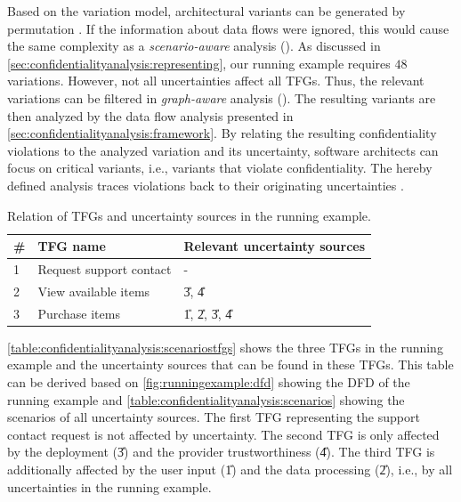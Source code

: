 Based on the variation model, architectural variants can be generated by permutation \cite{mehl_palladio_2022}.
If the information about data flows were ignored, this would cause the same complexity as a \emph{scenario-aware} analysis ().
As discussed in \autoref{sec:confidentialityanalysis:representing}, our running example requires $48$ variations.
However, not all uncertainties affect all \acp{TFG}.
Thus, the relevant variations can be filtered in \emph{graph-aware} analysis ().
The resulting variants are then analyzed by the data flow analysis presented in \autoref{sec:confidentialityanalysis:framework}.
By relating the resulting confidentiality violations to the analyzed variation and its uncertainty, software architects can focus on critical variants, i.e., variants that violate confidentiality.
The hereby defined analysis traces violations back to their originating uncertainties \cite{bitschi_uncertainty-aware_2022}.

\begin{table}
    \centering
    \begin{tabular}{lll}
        \toprule
        \# & \ac{TFG} name & Relevant uncertainty sources\\
        \midrule
        1 & Request support contact & -  \\
        2 & View available items & \U{3}, \U{4} \\
        3 & Purchase items & \U{1}, \U{2}, \U{3}, \U{4} \\
        \bottomrule
    \end{tabular}
    \caption{Relation of \acfp*{TFG} and uncertainty sources in the running example.}%
    \label{table:confidentialityanalysis:scenariostfgs}
\end{table}

\autoref{table:confidentialityanalysis:scenariostfgs} shows the three \acp{TFG} in the running example and the uncertainty sources that can be found in these \acp{TFG}.
This table can be derived based on \autoref{fig:runningexample:dfd} showing the \ac{DFD} of the running example and \autoref{table:confidentialityanalysis:scenarios} showing the scenarios of all uncertainty sources.
The first \ac{TFG} representing the support contact request is not affected by uncertainty.
The second \ac{TFG} is only affected by the deployment (\U{3}) and the provider trustworthiness (\U{4}).
The third \ac{TFG} is additionally affected by the user input (\U{1}) and the data processing (\U{2}), i.e., by all uncertainties in the running example.

